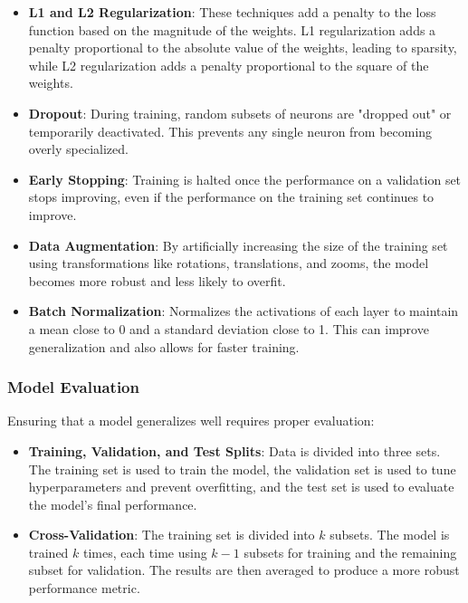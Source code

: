 \begin{itemize}
    \item \textbf{L1 and L2 Regularization}: These techniques add a penalty to the loss function based on the magnitude of the weights. L1 regularization adds a penalty proportional to the absolute value of the weights, leading to sparsity, while L2 regularization adds a penalty proportional to the square of the weights.
    \item \textbf{Dropout}: During training, random subsets of neurons are "dropped out" or temporarily deactivated. This prevents any single neuron from becoming overly specialized.
    \item \textbf{Early Stopping}: Training is halted once the performance on a validation set stops improving, even if the performance on the training set continues to improve.
    \item \textbf{Data Augmentation}: By artificially increasing the size of the training set using transformations like rotations, translations, and zooms, the model becomes more robust and less likely to overfit.
    \item \textbf{Batch Normalization}: Normalizes the activations of each layer to maintain a mean close to 0 and a standard deviation close to 1. This can improve generalization and also allows for faster training.
\end{itemize}

\subsubsection{Model Evaluation}

Ensuring that a model generalizes well requires proper evaluation:

\begin{itemize}
    \item \textbf{Training, Validation, and Test Splits}: Data is divided into three sets. The training set is used to train the model, the validation set is used to tune hyperparameters and prevent overfitting, and the test set is used to evaluate the model's final performance.
    \item \textbf{Cross-Validation}: The training set is divided into \( k \) subsets. The model is trained \( k \) times, each time using \( k-1 \) subsets for training and the remaining subset for validation. The results are then averaged to produce a more robust performance metric.
\end{itemize}

